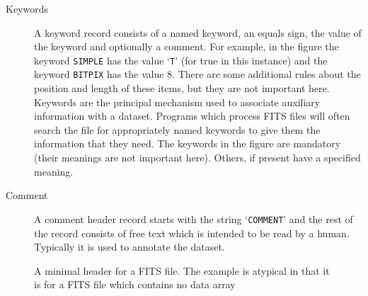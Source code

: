 \documentclass[twoside,11pt]{starlink}
\begin{document}
\begin{description}

  \item[Keywords] A keyword record consists of a named keyword, an
   equals sign, the value of the keyword and optionally a comment.  For
   example, in the figure the keyword \texttt{SIMPLE} has the value `\texttt{T}'
   (for true in this instance) and the keyword \texttt{BITPIX} has the value
   8.  There are some additional rules about the position and length of
   these items, but they are not important here.  Keywords are the principal
   mechanism used to associate auxiliary information with a dataset.
   Programs which process FITS files will often search the file for
   appropriately named keywords to give them the information that they
   need.  The keywords in the figure are mandatory (their meanings are not
   important here).  Others, if present have a specified meaning.

  \item[Comment] A comment header record starts with the string `\texttt{COMMENT}' and the rest of the record consists of free text which is
   intended to be read by a human.  Typically it is used to annotate the
   dataset.

\end{description}

\begin{figure}[htbp]

\begin{small}
\end{small}
\begin{quote}
\caption[A minimal FITS file header]{A minimal header for a FITS
file.  The example is atypical in that it is for a FITS file which
contains no data array
\label{FITSHEAD} }
\end{quote}

\end{figure}
\end{document}
